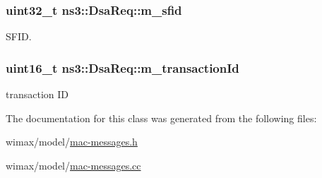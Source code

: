 \subsubsection[{\texorpdfstring{m\+\_\+sfid}{m_sfid}}]{\setlength{\rightskip}{0pt plus 5cm}uint32\+\_\+t ns3\+::\+Dsa\+Req\+::m\+\_\+sfid\hspace{0.3cm}{\ttfamily [private]}}\hypertarget{classns3_1_1DsaReq_ad01faff3f38505855b769cf988cb85ae}{}\label{classns3_1_1DsaReq_ad01faff3f38505855b769cf988cb85ae}


S\+F\+ID. 

\subsubsection[{\texorpdfstring{m\+\_\+transaction\+Id}{m_transactionId}}]{\setlength{\rightskip}{0pt plus 5cm}uint16\+\_\+t ns3\+::\+Dsa\+Req\+::m\+\_\+transaction\+Id\hspace{0.3cm}{\ttfamily [private]}}\hypertarget{classns3_1_1DsaReq_af9e7af21b5dbab2fa644bbd68a807096}{}\label{classns3_1_1DsaReq_af9e7af21b5dbab2fa644bbd68a807096}


transaction ID 



The documentation for this class was generated from the following files\+:\begin{DoxyCompactItemize}
\item 
wimax/model/\hyperlink{mac-messages_8h}{mac-\/messages.\+h}\item 
wimax/model/\hyperlink{mac-messages_8cc}{mac-\/messages.\+cc}\end{DoxyCompactItemize}
